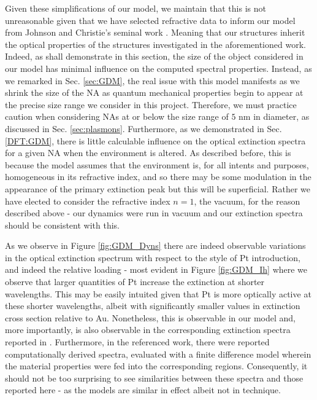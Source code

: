 Given these simplifications of our model, we maintain that this is not unreasonable given that we have selected refractive data to inform our model from Johnson and Christie's seminal work \cite{PhysRevB.6.4370}. Meaning that our structures inherit the optical properties of the structures investigated in the aforementioned work. Indeed, as shall demonstrate in this section, the size of the object considered in our model has minimal influence on the computed spectral properties. Instead, as we remarked in Sec. \ref{sec:GDM}, the real issue with this model manifests as we shrink the size of the NA as quantum mechanical properties begin to appear at the precise size range we consider in this project. Therefore, we must practice caution when considering NAs at or below the size range of $5$ nm in diameter, as discussed in Sec. \ref{sec:plasmons}. Furthermore, as we demonstrated in Sec. \ref{DFT:GDM}, there is little calculable influence on the optical extinction spectra for a given NA when the environment is altered. As described before, this is because the model assumes that the environment is, for all intents and purposes, homogeneous in its refractive index, and so there may be some modulation in the appearance of the primary extinction peak but this will be superficial. Rather we have elected to consider the refractive index $n = 1$, the vacuum, for the reason described above - our dynamics were run in vacuum and our extinction spectra should be consistent with this.


As we observe in Figure \ref{fig:GDM_Dyns} there are indeed observable variations in the optical extinction spectrum with respect to the style of Pt introduction, and indeed the relative loading - most evident in Figure \ref{fig:GDM_Ih} where we observe that larger quantities of Pt increase the extinction at shorter wavelengths. This may be easily intuited given that Pt is more optically active at these shorter wavelengths, albeit with significantly smaller values in extinction cross section relative to Au. Nonetheless, this is observable in our model and, more importantly, is also observable in the corresponding extinction spectra reported in \cite{JorgeStructure}. Furthermore, in the referenced work, there were reported computationally derived spectra, evaluated with a finite difference model wherein the material properties were fed into the corresponding regions. Consequently, it should not be too surprising to see similarities between these spectra and those reported here - as the models are similar in effect albeit not in technique.

